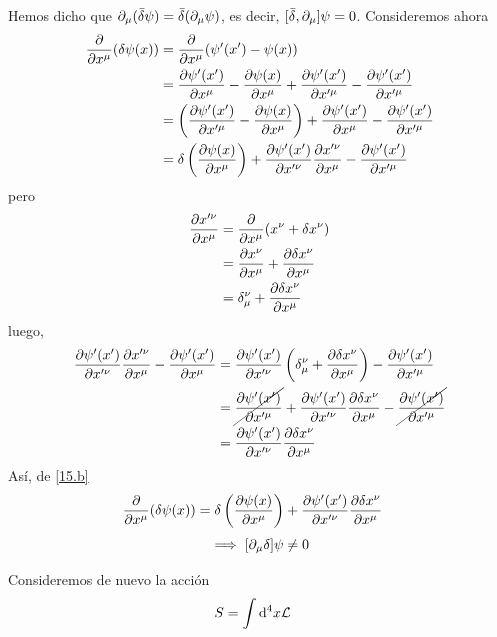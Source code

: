 Hemos dicho que $\partial_\mu (\bar{\delta} \psi)=\bar{\delta}(\partial_\mu \psi)$, es decir, $[\bar{\delta},\partial_\mu ]\psi=0$. Consideremos ahora
\begin{align}
  \pdv{x^\mu}(\delta\psi(x))&=\pdv{x^\mu}(\psi'(x')-\psi(x))\\
  &=\pdv{\psi'(x')}{x^\mu}-\pdv{\psi(x)}{x^\mu}+\pdv{\psi'(x')}{x'^\mu}-\pdv{\psi'(x')}{x'^\mu}\\
  &=\left(\pdv{\psi'(x')}{x'^\mu}-\pdv{\psi(x)}{x^\mu}\right)+\pdv{\psi'(x')}{x^\mu}-\pdv{\psi'(x')}{x'^\mu}\\
  &=\delta \left(\pdv{\psi(x)}{x^\mu}\right)+\pdv{\psi'(x')}{x'^\nu}\pdv{x'^\nu}{x^\mu}-\pdv{\psi'(x')}{x'^\mu}\label{15.b}
\end{align}
pero
\begin{align}
  \pdv{x'^\nu}{x^\mu}&=\pdv{x^\mu}(x^\nu +\delta x^\nu )\\
  &=\pdv{x^\nu}{x^\mu}+\pdv{\delta x^\nu}{x^\mu}\\
  &=\delta^\nu_\mu +\pdv{\delta x^\nu}{x^\mu}
\end{align}
luego,
\begin{align}
  \pdv{\psi'(x')}{x'^\nu}\pdv{x'^\nu}{x^\mu}-\pdv{\psi'(x')}{x^\mu}&=\pdv{\psi'(x')}{x'^\nu}\left(\delta^\nu_\mu +\pdv{\delta x^\nu}{x^\mu}\right)-\pdv{\psi'(x')}{x'^\mu}\\
  &=\cancel{\pdv{\psi'(x')}{x'^\mu}}+\pdv{\psi'(x')}{x'^\nu}\pdv{\delta x^\nu}{x^\mu}-\cancel{\pdv{\psi'(x')}{x'^\mu}}\\
  &=\pdv{\psi'(x')}{x'^\nu}\pdv{\delta x^\nu}{x^\mu}
\end{align}
Así, de \eqref{15.b}
\begin{align}
  \pdv{x^\mu}(\delta\psi(x))&=\delta \left(\pdv{\psi(x)}{x^\mu}\right)+\pdv{\psi'(x')}{x'^\nu}\pdv{\delta x^\nu}{x^\mu}
\end{align}
\begin{equation}
  \implies [\partial_\mu \delta ]\psi\neq 0
\end{equation}

Consideremos de nuevo la acción
\begin{align}
  S&=\int\dd^4x\mathcal{L} 
\end{align}

